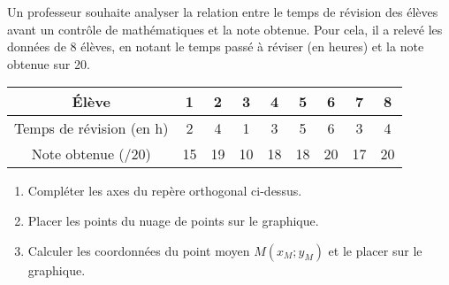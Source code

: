 \documentclass[11pt]{article}
\begin{document}

\begin{exercicedevoir}
Un professeur souhaite analyser la relation entre le temps de révision des élèves avant un contrôle de mathématiques et la note obtenue. Pour cela, il a relevé les données de 8 élèves, en notant le temps passé à réviser (en heures) et la note obtenue sur 20.

\begin{center}
\begin{tabular}{|c|c|c|c|c|c|c|c|c|}
\hline
Élève & 1 & 2 & 3 & 4 & 5 & 6 & 7 & 8 \\
\hline
Temps de révision (en h) & 2 & 4 & 1 & 3 & 5 & 6 & 3 & 4 \\
\hline
Note obtenue (/20) & 15 & 19 & 10 & 18 & 18 & 20 & 17 & 20 \\
\hline
\end{tabular}
\end{center}


\begin{center}
\end{center}


\begin{enumerate}
\item Compléter les axes du repère orthogonal ci-dessus.
\item Placer les points du nuage de points sur le graphique.
\item Calculer les coordonnées du point moyen $M(x_M;y_M)$ et le
placer sur le graphique. \\ \dtf \\ \dtf \\ \dtf \\ \dtf \\ \dtf \\ \dtf
\end{enumerate}
\end{exercicedevoir}

\nonewpage
\end{document}
